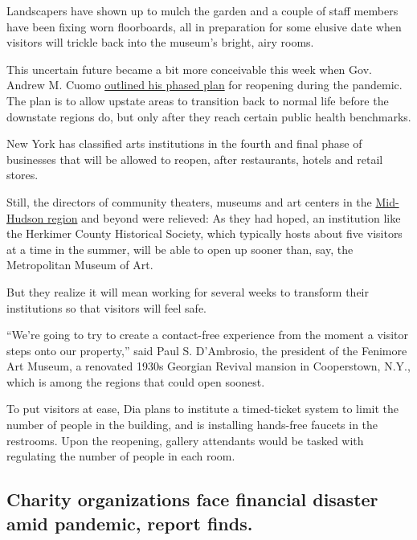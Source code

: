 Landscapers have shown up to mulch the garden and a couple of staff
members have been fixing worn floorboards, all in preparation for some
elusive date when visitors will trickle back into the museum's bright,
airy rooms.

This uncertain future became a bit more conceivable this week when Gov.
Andrew M. Cuomo
\href{https://www.nytimes3xbfgragh.onion/2020/05/04/nyregion/coronavirus-reopen-cuomo-ny.html}{outlined
his phased plan} for reopening during the pandemic. The plan is to allow
upstate areas to transition back to normal life before the downstate
regions do, but only after they reach certain public health benchmarks.

New York has classified arts institutions in the fourth and final phase
of businesses that will be allowed to reopen, after restaurants, hotels
and retail stores.

Still, the directors of community theaters, museums and art centers in
the \href{https://esd.ny.gov/regions/mid-hudson}{Mid-Hudson region} and
beyond were relieved: As they had hoped, an institution like the
Herkimer County Historical Society, which typically hosts about five
visitors at a time in the summer, will be able to open up sooner than,
say, the Metropolitan Museum of Art.

But they realize it will mean working for several weeks to transform
their institutions so that visitors will feel safe.

``We're going to try to create a contact-free experience from the moment
a visitor steps onto our property,'' said Paul S. D'Ambrosio, the
president of the Fenimore Art Museum, a renovated 1930s Georgian Revival
mansion in Cooperstown, N.Y., which is among the regions that could open
soonest.

To put visitors at ease, Dia plans to institute a timed-ticket system to
limit the number of people in the building, and is installing hands-free
faucets in the restrooms. Upon the reopening, gallery attendants would
be tasked with regulating the number of people in each room.

\hypertarget{charity-organizations-face-financial-disaster-amid-pandemic-report-finds}{%
\subsection{Charity organizations face financial disaster amid pandemic,
report
finds.}\label{charity-organizations-face-financial-disaster-amid-pandemic-report-finds}}

